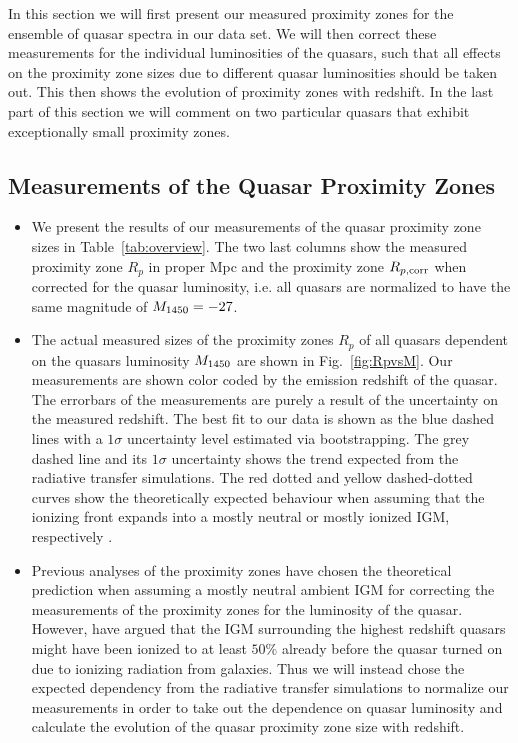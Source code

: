 \documentclass[iop]{emulateapj}
\newcommand{\hii} {\ion{H}{2}\xspace}
\begin{document}
In this section we will first present our measured proximity zones for the ensemble of quasar spectra in our data set. We will then correct these measurements for the individual luminosities of the quasars, such that all effects on the proximity zone sizes due to different quasar luminosities should be taken out. This then shows the evolution of proximity zones with redshift. In the last part of this section we will comment on two particular quasars that exhibit exceptionally small proximity zones. 

\subsection{Measurements of the Quasar Proximity Zones}

\begin{itemize}
\item We present the results of our measurements of the quasar proximity zone sizes in Table~\ref{tab:overview}. The two last columns show the measured proximity zone $R_p$ in proper Mpc and the proximity zone $R_{p, \rm corr}$ when corrected for the quasar luminosity, i.e. all quasars are normalized to have the same magnitude of $M_{\rm 1450}=-27$.  
\item The actual measured sizes of the proximity zones $R_p$ of all quasars dependent on the quasars luminosity $M_{\rm 1450}$ are shown in Fig.~\ref{fig:RpvsM}. Our measurements are shown color coded by the emission redshift of the quasar. The errorbars of the measurements are purely a result of the uncertainty on the measured redshift. The best fit to our data is shown as the blue dashed lines with a $1\sigma$ uncertainty level estimated via bootstrapping. The grey dashed line and its $1\sigma$ uncertainty shows the trend expected from the radiative transfer simulations. The red dotted and yellow dashed-dotted curves show the theoretically expected behaviour when assuming that the ionizing \hii front expands into a mostly neutral or mostly ionized IGM, respectively \citep{BoltonHaehnelt2006}. 
\item Previous analyses of the proximity zones have chosen the theoretical prediction when assuming a mostly neutral ambient IGM for correcting the measurements of the proximity zones for the luminosity of the quasar. However, \citet{Lidz2007} have argued that the IGM surrounding the highest redshift quasars might have been ionized to at least $50\%$ already before the quasar turned on due to ionizing radiation from galaxies. Thus we will instead chose the expected dependency from the radiative transfer simulations to normalize our measurements in order to take out the dependence on quasar luminosity and calculate the evolution of the quasar proximity zone size with redshift. 

\end{itemize}
\end{document}
